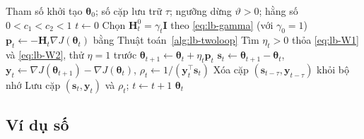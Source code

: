 \begin{algorithm}[t]
\caption{L-BFGS}\label{alg:lbfgs}
\begin{algorithmic}[1]
\Require Tham số khởi tạo $\boldsymbol{\theta}_0$; số cặp lưu trữ $\tau$; ngưỡng dừng $\vartheta>0$; hằng số $0<c_1<c_2<1$
\State $t\gets0$
  \State Chọn $\mathbf{H}_t^{0}=\gamma_t\mathbf{I}$ theo \eqref{eq:lb-gamma} (với $\gamma_0=1$)
  \State $\mathbf{p}_t\gets-\mathbf{H}_t\nabla J(\boldsymbol{\theta}_t)$ bằng Thuật toán~\ref{alg:lb-twoloop}
  \State Tìm $\eta_t>0$ thỏa \eqref{eq:lb-W1} và \eqref{eq:lb-W2}, thử $\eta=1$ trước
  \State $\boldsymbol{\theta}_{t+1}\gets\boldsymbol{\theta}_t+\eta_t\mathbf{p}_t$
  \State $\mathbf{s}_t\gets\boldsymbol{\theta}_{t+1}-\boldsymbol{\theta}_t$, \quad $\mathbf{y}_t\gets\nabla J(\boldsymbol{\theta}_{t+1})-\nabla J(\boldsymbol{\theta}_t)$, \quad $\rho_t\gets1/(\mathbf{y}_t^{\top}\mathbf{s}_t)$
    \State Xóa cặp $(\mathbf{s}_{t-\tau},\mathbf{y}_{t-\tau})$ khỏi bộ nhớ
  \EndIf
  \State Lưu cặp $(\mathbf{s}_t,\mathbf{y}_t)$ và $\rho_t$; \quad $t\gets t+1$
\EndWhile
\State \Return $\boldsymbol{\theta}_t$
\end{algorithmic}
\end{algorithm}

\subsection{Ví dụ số}

